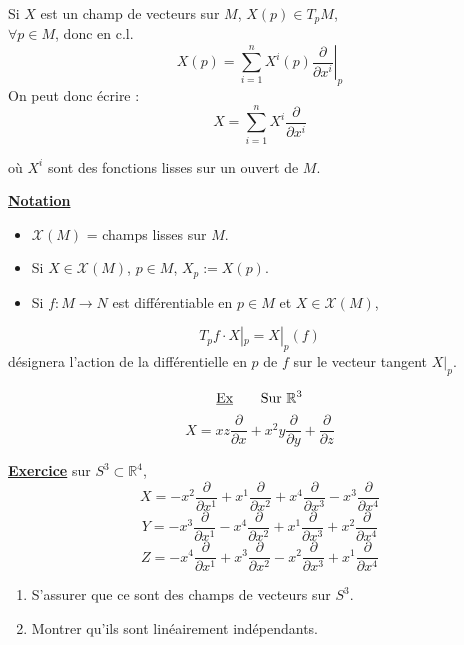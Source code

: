 \documentclass[11pt,a4paper]{article}
\begin{document}
		
		Si $X$ est un champ de vecteurs sur $M$, $X(p) \in T_pM$, \\
		$\forall p \in M$, donc en c.l.
		\[
		X(p) = \sum_{i=1}^{n} X^i(p) \left. \frac{\partial}{\partial x^i} \right|_p
		\]
		On peut donc écrire :
		\[
		X = \sum_{i=1}^{n} X^i \frac{\partial}{\partial x^i}
		\]
		
		
		où $X^i$ sont des fonctions lisses sur un ouvert de $M$.
		
		\underline{\textbf{Notation}}
		
		\begin{itemize}
			\item $\mathscr{X}(M)$ = champs lisses sur $M$.
			\item Si $X \in \mathscr{X}(M)$, $p \in M$, $X_p := X(p)$.
			\item Si $f : M \longrightarrow N$ est différentiable en $p \in M$ et $X \in \mathscr{X}(M)$,
		\end{itemize}
		
		\[
		T_p f \cdot X|_p = X|_p(f)
		\]
		désignera l'action de la différentielle en $p$ de $f$ sur le vecteur tangent $X|_p$.
		
		\[
		\text{\underline{Ex}} \qquad \text{Sur } \mathbb{R}^3
		\]
		\[
		X = xz \frac{\partial}{\partial x} + x^2 y \frac{\partial}{\partial y} + \frac{\partial}{\partial z}
		\]
		
		\underline{\textbf{Exercice}} sur $S^3 \subset \mathbb{R}^4$, \\
		
		\[
		X = -x^2 \frac{\partial}{\partial x^1} + x^1 \frac{\partial}{\partial x^2} + x^4 \frac{\partial}{\partial x^3} - x^3 \frac{\partial}{\partial x^4}
		\]
		\[
		Y = -x^3 \frac{\partial}{\partial x^1} - x^4 \frac{\partial}{\partial x^2} + x^1 \frac{\partial}{\partial x^3} + x^2 \frac{\partial}{\partial x^4}
		\]
		\[
		Z = -x^4 \frac{\partial}{\partial x^1} + x^3 \frac{\partial}{\partial x^2} - x^2 \frac{\partial}{\partial x^3} + x^1 \frac{\partial}{\partial x^4}
		\]
		
		\vspace{0.3cm}
		\begin{enumerate}
			
			\item S'assurer que ce sont des champs de vecteurs sur $S^3$.
			\item Montrer qu'ils sont linéairement indépendants.
			
		\end{enumerate}
		
\end{document}

